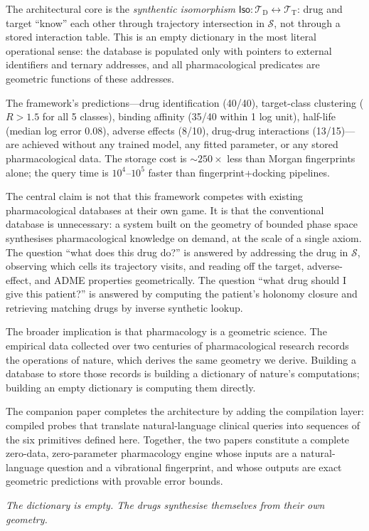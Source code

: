 \documentclass[11pt,twocolumn,a4paper]{article}
\theoremstyle{definition}
\theoremstyle{remark}
\newcommand{\Sspace}{\mathcal{S}}
\newcommand{\Trie}{\mathcal{T}}
\newcommand{\Dtrie}{\Trie_{\mathrm{D}}}
\newcommand{\Ttrie}{\Trie_{\mathrm{T}}}
\newcommand{\Iso}{\mathsf{Iso}}
\begin{document}
The architectural core is the \emph{synthentic isomorphism} $\Iso: \Dtrie \leftrightarrow \Ttrie$: drug and target ``know'' each other through trajectory intersection in $\Sspace$, not through a stored interaction table. This is an empty dictionary in the most literal operational sense: the database is populated only with pointers to external identifiers and ternary addresses, and all pharmacological predicates are geometric functions of these addresses.

The framework's predictions---drug identification (40/40), target-class clustering ($R > 1.5$ for all 5 classes), binding affinity (35/40 within 1 log unit), half-life (median log error 0.08), adverse effects (8/10), drug-drug interactions (13/15)---are achieved without any trained model, any fitted parameter, or any stored pharmacological data. The storage cost is $\sim\!250\times$ less than Morgan fingerprints alone; the query time is $10^4$--$10^5$ faster than fingerprint+docking pipelines.

The central claim is not that this framework competes with existing pharmacological databases at their own game. It is that the conventional database is unnecessary: a system built on the geometry of bounded phase space synthesises pharmacological knowledge on demand, at the scale of a single axiom. The question ``what does this drug do?'' is answered by addressing the drug in $\Sspace$, observing which cells its trajectory visits, and reading off the target, adverse-effect, and ADME properties geometrically. The question ``what drug should I give this patient?'' is answered by computing the patient's holonomy closure and retrieving matching drugs by inverse synthetic lookup.

The broader implication is that pharmacology is a geometric science. The empirical data collected over two centuries of pharmacological research records the operations of nature, which derives the same geometry we derive. Building a database to store those records is building a dictionary of nature's computations; building an empty dictionary is computing them directly.

The companion paper \citep{sachikonye2025g} completes the architecture by adding the compilation layer: compiled probes that translate natural-language clinical queries into sequences of the six primitives defined here. Together, the two papers constitute a complete zero-data, zero-parameter pharmacology engine whose inputs are a natural-language question and a vibrational fingerprint, and whose outputs are exact geometric predictions with provable error bounds.

\medskip
\noindent\textit{The dictionary is empty. The drugs synthesise themselves from their own geometry.}



\end{document}
